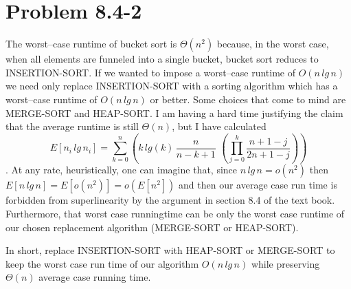 \documentclass{article}
\begin{document}
  \section*{Problem 8.4-2}
    The worst--case runtime of bucket sort is $\Theta(n^2)$ because, in the worst case, when all elements are funneled into a single bucket, bucket sort reduces to INSERTION-SORT.
    If we wanted to impose a worst--case runtime of $O(n \, lg \,n)$ we need only replace INSERTION-SORT with a sorting algorithm which has a worst--case runtime of $O(n\, lg \,n)$ or better.
    Some choices that come to mind are MERGE-SORT and HEAP-SORT.
    I am having a hard time justifying the claim that the average runtime is still $\Theta(n)$, but I have calculated
    $$E[n_i \, lg \, n_i] = \sum_{k=0}^{n} (k \, lg(k) \, \frac{n}{n-k+1}\,\,(\prod_{j=0}^{k}\frac{n+1-j}{2n+1-j})) $$.
    At any rate, heuristically, one can imagine that, since $n \, lg \,n = o(n^2)$ then $E[n \,lg\,n] = E[o(n^2)] = o(E[n^2])$ and then our average case run time is forbidden from superlinearity by the argument in section 8.4 of the text book.
    Furthermore, that worst case runningtime can be only the worst case runtime of our chosen replacement algorithm (MERGE-SORT or HEAP-SORT).

    In short, replace INSERTION-SORT with HEAP-SORT or MERGE-SORT to keep the worst case run time of our algorithm $O(n\, lg \, n)$ while preserving $\Theta(n)$ average case running time.
\end{document}
